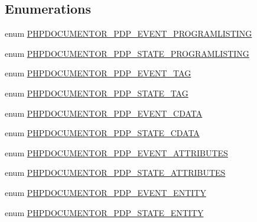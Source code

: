 \subsection*{\-Enumerations}
\begin{DoxyCompactItemize}
\item 
enum \hyperlink{_x_m_lpackage_page_parser_8inc_a0873938ca422e10c550d859dfc9f0eea}{\-P\-H\-P\-D\-O\-C\-U\-M\-E\-N\-T\-O\-R\-\_\-\-P\-D\-P\-\_\-\-E\-V\-E\-N\-T\-\_\-\-P\-R\-O\-G\-R\-A\-M\-L\-I\-S\-T\-I\-N\-G} 
\item 
enum \hyperlink{_x_m_lpackage_page_parser_8inc_a113e3049bc5381a680c256ef4092d79d}{\-P\-H\-P\-D\-O\-C\-U\-M\-E\-N\-T\-O\-R\-\_\-\-P\-D\-P\-\_\-\-S\-T\-A\-T\-E\-\_\-\-P\-R\-O\-G\-R\-A\-M\-L\-I\-S\-T\-I\-N\-G} 
\item 
enum \hyperlink{_x_m_lpackage_page_parser_8inc_a0c620d1f056e003e68370c4a604cd734}{\-P\-H\-P\-D\-O\-C\-U\-M\-E\-N\-T\-O\-R\-\_\-\-P\-D\-P\-\_\-\-E\-V\-E\-N\-T\-\_\-\-T\-A\-G} 
\item 
enum \hyperlink{_x_m_lpackage_page_parser_8inc_a42f9d551a96eb54e179f50b1f4162cf2}{\-P\-H\-P\-D\-O\-C\-U\-M\-E\-N\-T\-O\-R\-\_\-\-P\-D\-P\-\_\-\-S\-T\-A\-T\-E\-\_\-\-T\-A\-G} 
\item 
enum \hyperlink{_x_m_lpackage_page_parser_8inc_a6c552d03e3c852df9e1e27f8ccd5c228}{\-P\-H\-P\-D\-O\-C\-U\-M\-E\-N\-T\-O\-R\-\_\-\-P\-D\-P\-\_\-\-E\-V\-E\-N\-T\-\_\-\-C\-D\-A\-T\-A} 
\item 
enum \hyperlink{_x_m_lpackage_page_parser_8inc_ae5d70db78421917fb7987d300b4ab6a1}{\-P\-H\-P\-D\-O\-C\-U\-M\-E\-N\-T\-O\-R\-\_\-\-P\-D\-P\-\_\-\-S\-T\-A\-T\-E\-\_\-\-C\-D\-A\-T\-A} 
\item 
enum \hyperlink{_x_m_lpackage_page_parser_8inc_a2d324459b5858ff987d8767f2271a9b6}{\-P\-H\-P\-D\-O\-C\-U\-M\-E\-N\-T\-O\-R\-\_\-\-P\-D\-P\-\_\-\-E\-V\-E\-N\-T\-\_\-\-A\-T\-T\-R\-I\-B\-U\-T\-E\-S} 
\item 
enum \hyperlink{_x_m_lpackage_page_parser_8inc_a13af21c9746850e31fd43f1b5bccb9c0}{\-P\-H\-P\-D\-O\-C\-U\-M\-E\-N\-T\-O\-R\-\_\-\-P\-D\-P\-\_\-\-S\-T\-A\-T\-E\-\_\-\-A\-T\-T\-R\-I\-B\-U\-T\-E\-S} 
\item 
enum \hyperlink{_x_m_lpackage_page_parser_8inc_afbab08c06af721a565d489e581560d57}{\-P\-H\-P\-D\-O\-C\-U\-M\-E\-N\-T\-O\-R\-\_\-\-P\-D\-P\-\_\-\-E\-V\-E\-N\-T\-\_\-\-E\-N\-T\-I\-T\-Y} 
\item 
enum \hyperlink{_x_m_lpackage_page_parser_8inc_afa72520468ae225ecc141f9af527c984}{\-P\-H\-P\-D\-O\-C\-U\-M\-E\-N\-T\-O\-R\-\_\-\-P\-D\-P\-\_\-\-S\-T\-A\-T\-E\-\_\-\-E\-N\-T\-I\-T\-Y} 
\end{DoxyCompactItemize}


